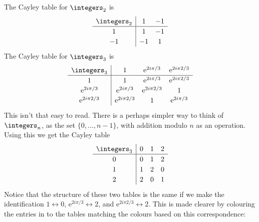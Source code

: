 \documentclass[fleqn]{NotesClass}
\newcommand*{\e}{\mathrm{e}}
\begin{document}
    The Cayley table for \(\integers_2\) is
    \begin{equation}
        \begin{array}{c|cc}
            \integers_2 & 1  & -1\\ \hline
            1           & 1  & -1\\
            -1          & -1 & 1
        \end{array}
    \end{equation}
    The Cayley table for \(\integers_3\) is
    \begin{equation}
        \renewcommand{\arraystretch}{1.2}
        \begin{array}{c|ccc}
            \integers_3    & 1              & \e^{2i\pi/3}   & \e^{2i\pi 2/3} \\ \hline
            1              & 1              & \e^{2i\pi/3}   & \e^{2i\pi 2/3} \\
            \e^{2i\pi/3}   & \e^{2i\pi/3}   & \e^{2i\pi 2/3} & 1 \\
            \e^{2i\pi 2/3} & \e^{2i\pi 2/3} & 1              & \e^{2i\pi/3}
        \end{array}
    \end{equation}
    This isn't that easy to read.
    There is a perhaps simpler way to think of \(\integers_n\), as the set \(\{0, \dotsc, n-1\}\), with addition modulo \(n\) as an operation.
    Using this we get the Cayley table
    \begin{equation}
        \begin{array}{c|ccc}
            \integers_3 & 0 & 1 & 2\\ \hline
            0           & 0 & 1 & 2\\
            1           & 1 & 2 & 0\\
            2           & 2 & 0 & 1
        \end{array}
    \end{equation}
    Notice that the structure of these two tables is the same if we make the identification \(1 \leftrightarrow 0\), \(\e^{2i\pi/3} \leftrightarrow 2\), and \(\e^{2i\pi 2/3} \leftrightarrow 2\).
    This is made clearer by colouring the entries in to the tables matching the colours based on this correspondence:
\end{document}
